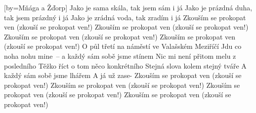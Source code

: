 [by={Mňága a Žďorp}]
\emptyv
\cseq{\[D] \[G\hidx{maj7}] \[Em] \[A]}
\cl\chordsoff
\averse
Jako je sama skála, tak jsem sám i já
Jako je prázdná duha, tak jsem prázdný i já
Jako je zrádná voda, tak zradím i já
\cl\chor
Zkouším se prokopat ven  (zkouší se prokopat ven!)
Zkouším se prokopat ven  (zkouší se prokopat ven!)
Zkouším se prokopat ven  (zkouší se prokopat ven!)
Zkouším se prokopat ven  (zkouší se prokopat ven!)
\cl\bverse
O půl třetí na náměstí ve Valašském Meziříčí
Jdu co noha nohu mine~-- a každý sám sobě jsme stínem
Nic mi není přitom melu z posledního
Těžko říct o tom něco konkrétního
Stejná slova kolem stejný tváře
A každý sám sobě jsme lhářem
A já už zase-
\cl\chor
Zkouším se prokopat ven  (zkouší se prokopat ven!)
Zkouším se prokopat ven  (zkouší se prokopat ven!)
Zkouším se prokopat ven  (zkouší se prokopat ven!)
Zkouším se prokopat ven  (zkouší se prokopat ven!)
\cl
\endsong




